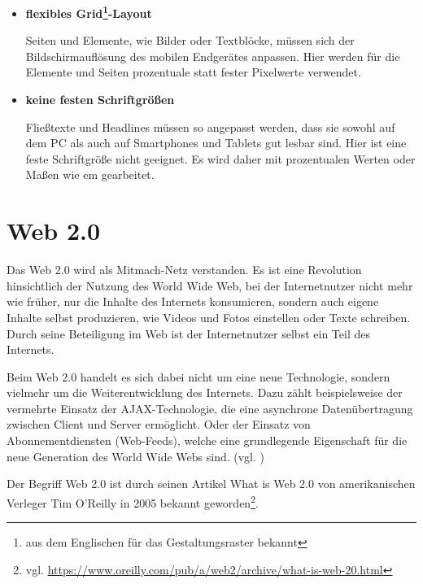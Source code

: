 \begin{itemize}
\item \textbf{flexibles Grid\footnote{aus dem Englischen für das Gestaltungsraster bekannt}-Layout}\par
Seiten und Elemente, wie Bilder oder Textblöcke, müssen sich der Bildschirmauflösung des mobilen Endgerätes anpassen. Hier werden für die Elemente und Seiten prozentuale statt fester Pixelwerte verwendet.
\item \textbf{keine festen Schriftgrößen}\par
Fließtexte und Headlines müssen so angepasst werden, dass sie sowohl auf dem PC als auch auf Smartphones und Tablets gut lesbar sind. Hier ist eine feste Schriftgröße nicht geeignet. Es wird daher mit prozentualen Werten oder Maßen wie em gearbeitet.
\end{itemize}

\section{Web 2.0}
\label{sec:web2.0}
Das Web 2.0 wird als \glqq Mitmach-Netz\grqq{} verstanden. Es ist eine Revolution hinsichtlich der Nutzung des World Wide Web, bei der Internetnutzer nicht mehr wie früher, nur die Inhalte des Internets konsumieren, sondern auch eigene Inhalte selbst produzieren, wie Videos und Fotos einstellen oder Texte schreiben. Durch seine Beteiligung im Web ist der Internetnutzer selbst ein Teil des Internets.\bigskip 

Beim Web 2.0 handelt es sich dabei nicht um eine neue Technologie, sondern vielmehr um die Weiterentwicklung des Internets. Dazu zählt beispielsweise der vermehrte Einsatz der AJAX-Technologie, die eine asynchrone Datenübertragung zwischen Client und Server ermöglicht. Oder der Einsatz von Abonnementdiensten (Web-Feeds), welche eine grundlegende Eigenschaft für die neue Generation des World Wide Webs sind. (vgl. \cite{o.V.2008})\bigskip

Der Begriff Web 2.0 ist durch seinen Artikel \glqq What is Web 2.0\grqq{} von amerikanischen Verleger Tim O’Reilly in 2005 bekannt geworden\footnote{vgl. \url{https://www.oreilly.com/pub/a/web2/archive/what-is-web-20.html}}.\bigskip

